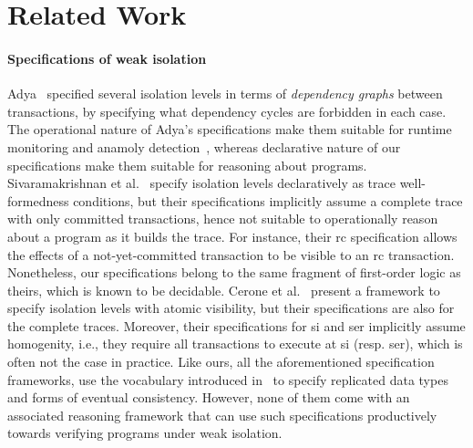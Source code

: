 \section{Related Work}

\paragraph{Specifications of weak isolation}
Adya~\cite{adyaphd} specified several isolation levels in terms of
\emph{dependency graphs} between transactions, by specifying what
dependency cycles are forbidden in each case. The operational nature
of Adya's specifications make them suitable for runtime monitoring and
anamoly detection~\cite{kemmevldb,feketesigmod08,pssi2011}, whereas
declarative nature of our specifications make them suitable for
reasoning about programs. Sivaramakrishnan et al.~\cite{pldi15} specify
isolation levels declaratively as trace well-formedness conditions,
but their specifications implicitly assume a complete trace with only
committed transactions, hence not suitable to operationally reason
about a program as it builds the trace. For instance, their {\sc rc}
specification allows the effects of a not-yet-committed transaction to
be visible to an {\sc rc} transaction.  Nonetheless, our
specifications belong to the same fragment of first-order logic as
theirs, which is known to be decidable. Cerone et
al.~\cite{gotsmanconcur15} present a framework to specify isolation
levels with atomic visibility, but their specifications are also for
the complete traces.  Moreover, their specifications for {\sc si} and
{\sc ser} implicitly assume homogenity, i.e., they require all
transactions to execute at {\sc si} (resp.  {\sc ser}), which is often
not the case in practice. Like ours, all the aforementioned
specification frameworks, use the vocabulary introduced
in~\cite{burckhardt14} to specify replicated data types and forms of
eventual consistency. However, none of them come with an associated
reasoning framework that can use such specifications productively
towards verifying programs under weak isolation.

